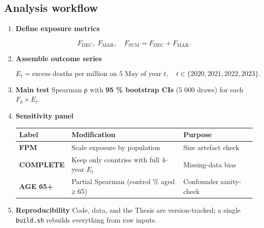 \documentclass[
  authoryear,
  preprint,
  3p,
  onecolumn]{elsarticle}
\begin{document}
\subsection{Analysis workflow}\label{analysis-workflow}

\begin{enumerate}
\def\labelenumi{\arabic{enumi}.}
\item
  \textbf{Define exposure metrics}

  \[
    F_{\text{DEC}},\;F_{\text{MAR}},\quad
    F_{\text{SUM}}=F_{\text{DEC}}+F_{\text{MAR}}.
  \]
\item
  \textbf{Assemble outcome series}

  \[
    E_t=\text{excess deaths per million on 5 May of year }t,\quad t\in\{2020,2021,2022,2023\}.
  \]
\item
  \textbf{Main test} Spearman ρ with \textbf{95 \% bootstrap CIs} (5 000
  draws) for each \(F_k \times E_t\).
\item
  \textbf{Sensitivity panel}

  \begin{longtable}[]{@{}
    >{\raggedright\arraybackslash}p{}
    >{\raggedright\arraybackslash}p{}
    >{\raggedright\arraybackslash}p{}@{}}
  \toprule\noalign{}
  \begin{minipage}[b]{\linewidth}\raggedright
  Label
  \end{minipage} & \begin{minipage}[b]{\linewidth}\raggedright
  Modification
  \end{minipage} & \begin{minipage}[b]{\linewidth}\raggedright
  Purpose
  \end{minipage} \\
  \midrule\noalign{}
  \endhead
  \bottomrule\noalign{}
  \endlastfoot
  \textbf{FPM} & Scale exposure by population & Size artefact check \\
  \textbf{COMPLETE} & Keep only countries with full 4-year \(E_t\) &
  Missing-data bias \\
  \textbf{AGE 65+} & Partial Spearman (control \% aged ≥ 65) &
  Confounder sanity-check \\
  \end{longtable}
\item
  \textbf{Reproducibility} Code, data, and the Thesis are
  version-tracked; a single \texttt{build.sh} rebuilds everything from
  raw inputs.
\end{enumerate}
\end{document}
